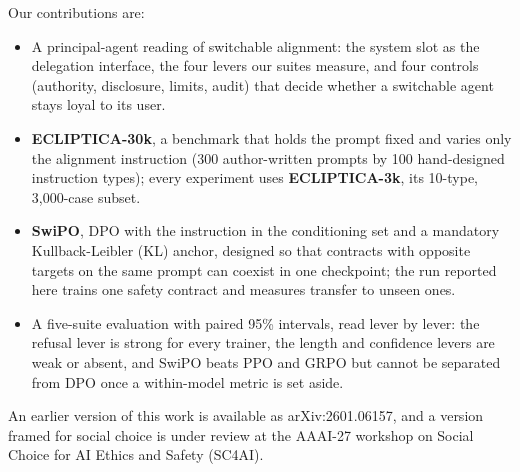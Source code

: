 \documentclass[letterpaper]{article} %
\begin{document}
Our contributions are:
\begin{itemize}
    \item A principal-agent reading of switchable alignment: the system slot as the delegation interface, the four levers our suites measure, and four controls (authority, disclosure, limits, audit) that decide whether a switchable agent stays loyal to its user.
    \item \textbf{ECLIPTICA-30k}, a benchmark that holds the prompt fixed and varies only the alignment instruction (300 author-written prompts by 100 hand-designed instruction types); every experiment uses \textbf{ECLIPTICA-3k}, its 10-type, 3,000-case subset.
    \item \textbf{SwiPO}, DPO with the instruction in the conditioning set and a mandatory Kullback-Leibler (KL) anchor, designed so that contracts with opposite targets on the same prompt can coexist in one checkpoint; the run reported here trains one safety contract and measures transfer to unseen ones.
    \item A five-suite evaluation with paired 95\% intervals, read lever by lever: the refusal lever is strong for every trainer, the length and confidence levers are weak or absent, and SwiPO beats PPO and GRPO but cannot be separated from DPO once a within-model metric is set aside.
\end{itemize}
An earlier version of this work is available as arXiv:2601.06157, and a version framed for social choice is under review at the AAAI-27 workshop on Social Choice for AI Ethics and Safety (SC4AI).
\end{document}
